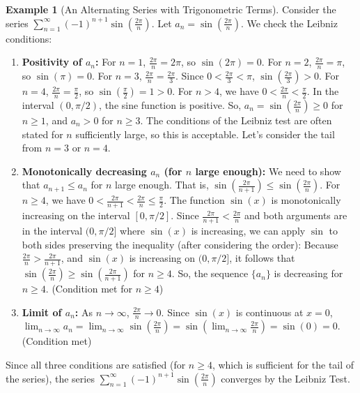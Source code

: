 \documentclass[11pt, a4paper]{article}
\theoremstyle{plain}
\theoremstyle{definition}
\newtheorem{example}[theorem]{Example} %
\theoremstyle{remark}
\begin{document}
\begin{example}[An Alternating Series with Trigonometric Terms]
Consider the series $\sum_{n=1}^{\infty} (-1)^{n+1} \sin\left(\frac{2\pi}{n}\right)$.
Let $a_n = \sin\left(\frac{2\pi}{n}\right)$. We check the Leibniz conditions:

\begin{enumerate}[label=(\roman*)]
    \item \textbf{Positivity of $a_n$:}
    For $n=1$, $\frac{2\pi}{n} = 2\pi$, so $\sin(2\pi) = 0$.
    For $n=2$, $\frac{2\pi}{n} = \pi$, so $\sin(\pi) = 0$.
    For $n=3$, $\frac{2\pi}{n} = \frac{2\pi}{3}$. Since $0 < \frac{2\pi}{3} < \pi$, $\sin(\frac{2\pi}{3}) > 0$.
    For $n=4$, $\frac{2\pi}{n} = \frac{\pi}{2}$, so $\sin(\frac{\pi}{2}) = 1 > 0$.
    For $n > 4$, we have $0 < \frac{2\pi}{n} < \frac{\pi}{2}$. In the interval $(0, \pi/2)$, the sine function is positive.
    So, $a_n = \sin\left(\frac{2\pi}{n}\right) \ge 0$ for $n \ge 1$, and $a_n > 0$ for $n \ge 3$. The conditions of the Leibniz test are often stated for $n$ sufficiently large, so this is acceptable. Let's consider the tail from $n=3$ or $n=4$.

    \item \textbf{Monotonically decreasing $a_n$ (for $n$ large enough):}
    We need to show that $a_{n+1} \le a_n$ for $n$ large enough. That is, $\sin\left(\frac{2\pi}{n+1}\right) \le \sin\left(\frac{2\pi}{n}\right)$.
    For $n \ge 4$, we have $0 < \frac{2\pi}{n+1} < \frac{2\pi}{n} \le \frac{\pi}{2}$.
    The function $\sin(x)$ is monotonically increasing on the interval $[0, \pi/2]$.
    Since $\frac{2\pi}{n+1} < \frac{2\pi}{n}$ and both arguments are in the interval $(0, \pi/2]$ where $\sin(x)$ is increasing, we can apply $\sin$ to both sides preserving the inequality (after considering the order):
    Because $\frac{2\pi}{n} > \frac{2\pi}{n+1}$, and $\sin(x)$ is increasing on $(0, \pi/2]$,
    it follows that $\sin\left(\frac{2\pi}{n}\right) \ge \sin\left(\frac{2\pi}{n+1}\right)$ for $n \ge 4$.
    So, the sequence $\{a_n\}$ is decreasing for $n \ge 4$. (Condition met for $n \ge 4$)

    \item \textbf{Limit of $a_n$:}
    As $n \to \infty$, $\frac{2\pi}{n} \to 0$.
    Since $\sin(x)$ is continuous at $x=0$,
    $\lim_{n \to \infty} a_n = \lim_{n \to \infty} \sin\left(\frac{2\pi}{n}\right) = \sin\left(\lim_{n \to \infty} \frac{2\pi}{n}\right) = \sin(0) = 0$. (Condition met)
\end{enumerate}
Since all three conditions are satisfied (for $n \ge 4$, which is sufficient for the tail of the series), the series $\sum_{n=1}^{\infty} (-1)^{n+1} \sin\left(\frac{2\pi}{n}\right)$ converges by the Leibniz Test.


\end{example}
\end{document}
